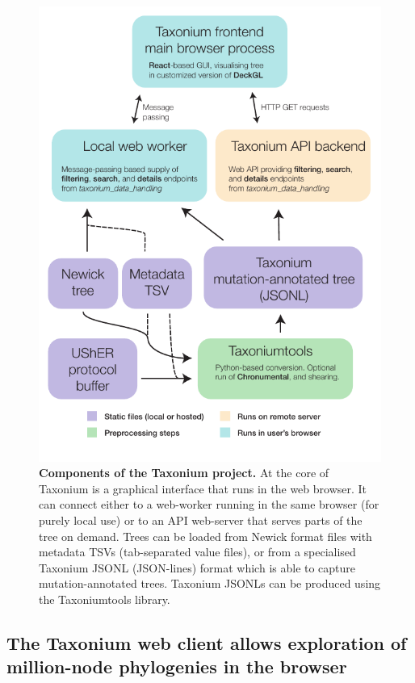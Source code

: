 \begin{figure}

\begin{center}
\includegraphics[width=\linewidth]{Figures/TaxoniumFlowChart.pdf}
\end{center}
\caption{\textbf{Components of the Taxonium project.} At the core of Taxonium is a graphical interface that runs in the web browser. It can connect either to a web-worker running in the same browser (for purely local use) or to an API web-server that serves parts of the tree on demand. Trees can be loaded from Newick format files with metadata TSVs (tab-separated value files), or from a specialised Taxonium JSONL (JSON-lines) format which is able to capture mutation-annotated trees. Taxonium JSONLs can be produced using the Taxoniumtools library.}
\label{fig:flowchart}
\end{figure}

\subsection*{The Taxonium web client allows exploration of million-node phylogenies in the browser}

